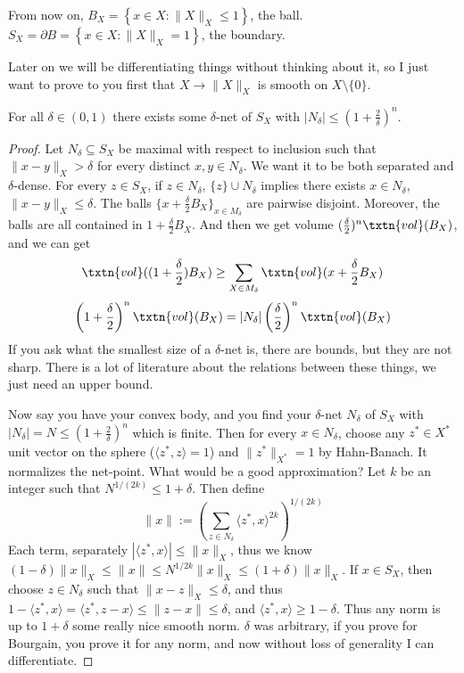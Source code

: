 From now on, $B_X = \left\{x \in X: \|X\|_X \leq 1 \right\}$, the ball. $S_X = \partial B = \left\{x \in X: \|X\|_X = 1\right\}$, the boundary. 

Later on we will be differentiating things without thinking about it, so I just want to prove to you first that $X \to \|X\|_X$ is smooth on $X \setminus \{0\}$. 

\begin{lem} For all $\delta \in (0, 1)$ there exists some $\delta$-net of $S_X$ with $|N_{\delta}| \leq \left(1 + \frac{2}{\delta}\right)^n$. 
\end{lem}
\begin{proof}
Let $N_{\delta} \subseteq S_X$ be maximal with respect to inclusion such that $\|x - y\|_X > \delta$ for every distinct $x, y \in N_{\delta}$. We want it to be both separated and $\delta$-dense. For every $z \in S_{X}$, if $z \in N_{\delta}$, $\{z\} \cup N_{\delta}$ implies there exists $x \in N_{\delta}$, $\|x - y\|_X \leq \delta$. The balls $\{x + \frac{\delta}{2}B_X\}_{x \in M_{\delta}}$ are pairwise disjoint. Moreover, the balls are all contained in $1 + \frac{\delta}{2}B_X$. And then we get volume $(\frac{\delta}{2})^n\txtn{vol}(B_X)$, and we can get
\[
\txtn{vol}((1 + \frac{\delta}{2})B_X) \geq \sum_{X \in M_{\delta}} \txtn{vol}(x + \frac{\delta}{2}B_X)
\]
\[
\left(1 + \frac{\delta}{2}\right)^n\txtn{vol}(B_X) = |N_{\delta}|\left(\frac{\delta}{2}\right)^n\txtn{vol}(B_X)
\]
If you ask what the smallest size of a $\delta$-net is, there are bounds, but they are not sharp. There is a lot of literature about the relations between these things, we just need an upper bound. 

Now say you have your convex body, and you find your $\delta$-net $N_{\delta}$  of $S_X$ with $|N_{\delta}| = N \leq (1 + \frac{2}{\delta})^n$ which is finite. Then for every $x \in N_{\delta}$, choose any $z^* \in X^*$ unit vector on the sphere ($\langle z^*, z \rangle = 1$) and $\|z^*\|_{X^*} = 1$ by Hahn-Banach. It normalizes the net-point. What would be a good approximation? Let $k$ be an integer such that $N^{1/(2k)} \leq 1 + \delta$. Then define 
\[
\|x\| := \left(\sum_{z \in N_{\delta}} \langle z^*, x \rangle^{2k}\right)^{1/(2k)}
\]
Each term, separately $|\langle z^*, x \rangle| \leq \|x\|_X$, thus we know $(1 - \delta)\|x\|_X \leq \|x\| \leq N^{1/2k}\|x\|_X \leq (1 + \delta)\|x\|_X$. If $x \in S_X$, then choose $z \in N_{\delta}$ such that $\|x - z\|_X \leq \delta$, and thus $1 - \langle z^*, x \rangle = \langle z^*, z - x \rangle \leq \|z - x\| \leq \delta$, and $\langle z^*, x \rangle \geq 1 - \delta$. Thus any norm is up to $1 + \delta$ some really nice smooth norm. $\delta$ was arbitrary, if you prove for Bourgain, you prove it for any norm, and now without loss of generality I can differentiate. 
\end{proof}

